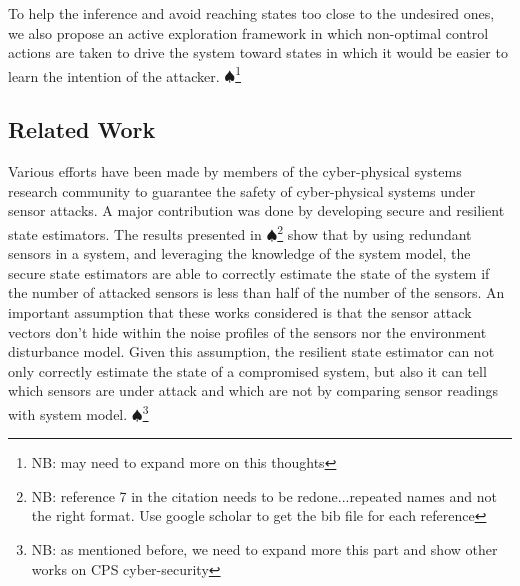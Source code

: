 \documentclass[letterpaper, 10 pt, conference]{ieeeconf}  %
\newcommand\NB[1]{$\spadesuit$\footnote{NB: #1}}
\begin{document}
To help the inference and avoid reaching states too close to the undesired ones, we also propose an active exploration framework in which non-optimal control actions are taken to drive the system toward states in which it would be easier to learn the intention of the attacker. \NB{may need to expand more on this thoughts}


\subsection{Related Work}\label{subsec:related}

Various efforts have been made by members of the cyber-physical systems research community to guarantee the safety of cyber-physical systems under sensor attacks. A major contribution was done by developing secure and resilient state estimators. The results presented in \cite{Fawzi2014,Ivanov2014,Pajic2014,Pajic2017} \NB{reference 7 in the citation needs to be redone...repeated names and not the right format. Use google scholar to get the bib file for each reference} show that by using redundant sensors in a system, and leveraging the knowledge of the system model, the secure state estimators are able to correctly estimate the state of the system if the number of attacked sensors is less than half of the number of the sensors. An important assumption that these works considered is that the sensor attack vectors don't hide within the noise profiles of the sensors nor the environment disturbance model. Given this assumption, the resilient state estimator can not only correctly estimate the state of a compromised system, but also it can tell which sensors are under attack and which are not by comparing sensor readings with system model. \NB{as mentioned before, we need to expand more this part and show other works on CPS cyber-security}
\end{document}
